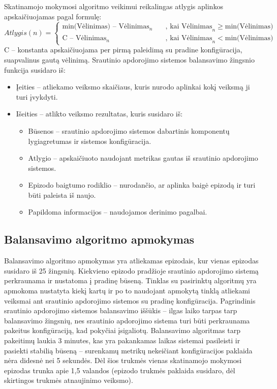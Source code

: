\documentclass{VUMIFPSbakalaurinis}
\begin{document}
Skatinamojo mokymosi algoritmo veikimui reikalingas atlygis aplinkos apskaičiuojamas pagal formulę:
\[ Atlygis(n) =
\begin{cases}
    \text{min(Vėlinimas) } – \text{ Vėlinimas}_n  & \quad \text{, kai Vėlinimas}_n \geq \text{min(Vėlinimas)}\\
    \text{C } – \text{ Vėlinimas}_n  & \quad \text{, kai Vėlinimas}_n < \text{min(Vėlinimas)}
\end{cases}
\]
C – konstanta apskaičiuojama per pirmą paleidimą su pradine konfigūracija, suapvalinus gautą vėlinimą. \newline
Srautinio apdorojimo sistemos balansavimo žingsnio funkcija susidaro iš:
\begin{itemize}
 \item Įeities – atliekamo veiksmo skaičiaus, kuris nurodo aplinkai kokį veiksmą ji turi įvykdyti.
 \item Išeities – atlikto veiksmo rezultatas, kuris susidaro iš:
 \begin{itemize}
    \item Būsenos – srautinio apdorojimo sistemos dabartinis komponentų lygiagretumas ir sistemos konfigūracija.
    \item Atlygio – apskaičiuoto naudojant metrikas gautas iš srautinio apdorojimo sistemos.
    \item Epizodo baigtumo rodiklio – nurodančio, ar aplinka baigė epizodą ir turi būti paleista iš naujo.
    \item Papildoma informacijos – naudojamos derinimo pagalbai.
 \end{itemize}
\end{itemize}

\subsection{Balansavimo algoritmo apmokymas}

Balansavimo algoritmo apmokymas yra atliekamas epizodais, kur vienas epizodas susidaro iš 25 žingsnių. Kiekvieno epizodo pradžioje srautinio apdorojimo sistemą perkraunama ir nustatoma į pradinę būseną. Tinklas su pasirinktų algoritmų yra apmokoma nustatyta kiekį kartų ir po to naudojant apmokytą tinklą atliekami veiksmai ant srautinio apdorojimo sistemos su pradinę konfigūracija. Pagrindinis srautinio apdorojimo sistemos balansavimo iššūkis – ilgas laiko tarpas tarp balansavimo žingsnių, nes srautinio apdorojimo sistema turi būti perkraunama pakeitus konfigūraciją, kad pokyčiai įsigaliotų. Balansavimo algoritmas tarp pakeitimų laukia 3 minutes, kas yra pakankamas laikas sistemai pasileisti ir pasiekti stabilią būseną – surenkamų metrikų nekeičiant konfigūracijos paklaida nėra didesnė nei 5 sekundės. Dėl šios trukmės vienas skatinamojo mokymosi epizodas trunka apie 1,5 valandos (epizodo trukmės paklaida susidaro, dėl skirtingos trukmės atnaujinimo veiksmo). 
\end{document}
